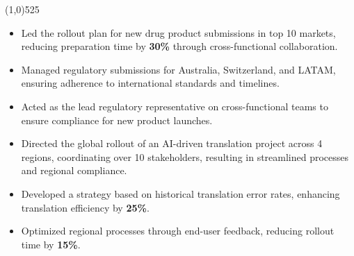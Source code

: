 \documentclass[a4paper]{deedy-resume} %
\begin{document}
\begin{center}
    \vspace{-17pt}
    \line(1,0){525}
    \vspace{-11pt}
\end{center}
    \vspace{-10pt}
    \begin{multicols}{2}
        \begin{itemize}
            \item Led the rollout plan for new drug product submissions in top 10 markets, reducing preparation time by \textbf{30\%} through cross-functional collaboration.
            \item Managed regulatory submissions for Australia, Switzerland, and LATAM, ensuring adherence to international standards and timelines.
            \item Acted as the lead regulatory representative on cross-functional teams to ensure compliance for new product launches.
        \end{itemize}
    \end{multicols}    
\vspace{-10pt}
    \vspace{-10pt}
    \begin{multicols}{2}
        \begin{itemize}
            \item Directed the global rollout of an AI-driven translation project across 4 regions, coordinating over 10 stakeholders, resulting in streamlined processes and regional compliance.
            \item Developed a strategy based on historical translation error rates, enhancing translation efficiency by \textbf{25\%}.
            \item Optimized regional processes through end-user feedback, reducing rollout time by \textbf{15\%}.
        \end{itemize}
    \end{multicols}
\vspace{-10pt}
\vspace{-10pt}
\end{document}
